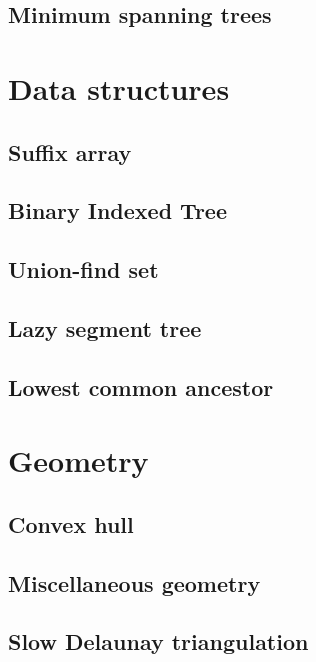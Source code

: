 \subsection{Minimum spanning trees}
\raggedbottom
\hrulefill

\section{Data structures}
\subsection{Suffix array}
\raggedbottom
\hrulefill
\subsection{Binary Indexed Tree}
\raggedbottom
\hrulefill
\subsection{Union-find set}
\raggedbottom
\hrulefill
\subsection{Lazy segment tree}
\raggedbottom
\hrulefill
\subsection{Lowest common ancestor}
\raggedbottom
\hrulefill

\section{Geometry}
\subsection{Convex hull}
\raggedbottom
\hrulefill
\subsection{Miscellaneous geometry}
\raggedbottom
\hrulefill
\subsection{Slow Delaunay triangulation}
\raggedbottom
\hrulefill

